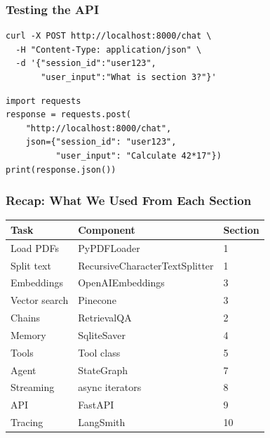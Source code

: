 \documentclass[aspectratio=169,11pt]{beamer}
\begin{document}
\begin{frame}[fragile]
  \frametitle{Testing the API}

  \begin{codebox}
    \tiny
    \begin{lstlisting}
curl -X POST http://localhost:8000/chat \
  -H "Content-Type: application/json" \
  -d '{"session_id":"user123",
       "user_input":"What is section 3?"}'
    \end{lstlisting}
  \end{codebox}

  \begin{codebox}[Using Python]
    \tiny
    \begin{lstlisting}
import requests
response = requests.post(
    "http://localhost:8000/chat",
    json={"session_id": "user123",
          "user_input": "Calculate 42*17"})
print(response.json())
    \end{lstlisting}
  \end{codebox}
\end{frame}

\begin{frame}
  \frametitle{Recap: What We Used From Each Section}

  \begin{tiny}
    \begin{tabular}{|l|l|l|}
      \toprule
      \textbf{Task} & \textbf{Component} & \textbf{Section} \\
      \midrule
      Load PDFs & PyPDFLoader & 1 \\
      Split text & RecursiveCharacterTextSplitter & 1 \\
      Embeddings & OpenAIEmbeddings & 3 \\
      Vector search & Pinecone & 3 \\
      Chains & RetrievalQA & 2 \\
      Memory & SqliteSaver & 4 \\
      Tools & Tool class & 5 \\
      Agent & StateGraph & 7 \\
      Streaming & async iterators & 8 \\
      API & FastAPI & 9 \\
      Tracing & LangSmith & 10 \\
      \bottomrule
    \end{tabular}
  \end{tiny}
\end{frame}
\end{document}
